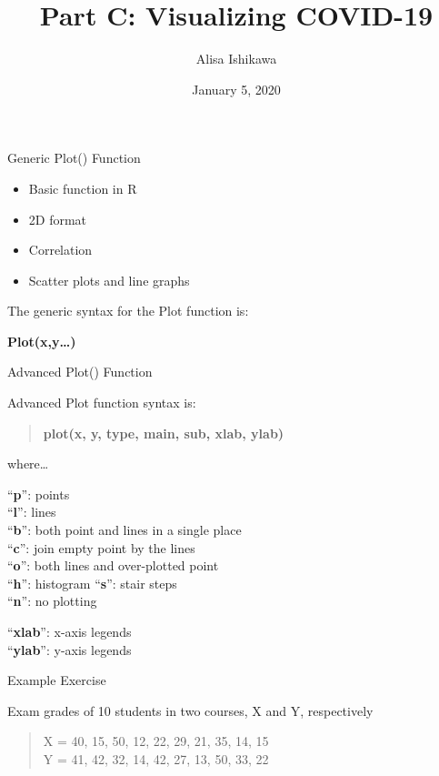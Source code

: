 \documentclass[
  ignorenonframetext,
]{beamer}
\title{Part C: Visualizing COVID-19}
\author{Alisa Ishikawa}
\date{January 5, 2020}
\providecommand{\tightlist}{%
  \setlength{\itemsep}{0pt}\setlength{\parskip}{0pt}}
\begin{document}
\frame{\titlepage}

\begin{frame}{Generic Plot() Function}
\protect\hypertarget{generic-plot-function}{}

\begin{itemize}
\tightlist
\item
  Basic function in R
\item
  2D format
\item
  Correlation
\item
  Scatter plots and line graphs
\end{itemize}

The generic syntax for the Plot function is:

\textbf{Plot(x,y\ldots)}

\end{frame}

\begin{frame}{Advanced Plot() Function}
\protect\hypertarget{advanced-plot-function}{}

Advanced Plot function syntax is:

\begin{quote}
\textbf{plot(x, y, type, main, sub, xlab, ylab)}
\end{quote}

where\ldots{}

``\textbf{p}'': points\\
``\textbf{l}'': lines\\
``\textbf{b}'': both point and lines in a single place\\
``\textbf{c}'': join empty point by the lines\\
``\textbf{o}'': both lines and over-plotted point\\
``\textbf{h}'': histogram ``\textbf{s}'': stair steps\\
``\textbf{n}'': no plotting

``\textbf{xlab}'': x-axis legends\\
``\textbf{ylab}'': y-axis legends

\end{frame}

\begin{frame}{Example Exercise}
\protect\hypertarget{example-exercise}{}

Exam grades of 10 students in two courses, X and Y, respectively\\

\begin{quote}
X = 40, 15, 50, 12, 22, 29, 21, 35, 14, 15\\
Y = 41, 42, 32, 14, 42, 27, 13, 50, 33, 22
\end{quote}

\end{frame}
\end{document}
